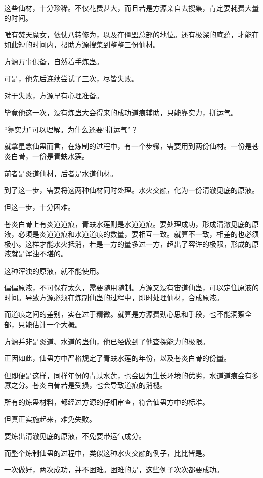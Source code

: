 \begin{this_body}
这些仙材，十分珍稀。不仅花费甚大，而且若是方源亲自去搜集，肯定要耗费大量的时间。

唯有焚天魔女，依仗八转修为，以及在僵盟总部的地位。还有极深的底蕴，才能在如此短的时间内，帮助方源搜集到整整三份仙材。

方源万事俱备，自然着手炼蛊。

可是，他先后连续尝试了三次，尽皆失败。

对于失败，方源早有心理准备。

毕竟他这一次，没有炼蛊大会得来的成功道痕辅助，只能靠实力，拼运气。

“靠实力”可以理解。为什么还要“拼运气”？

就拿星念仙蛊而言，在炼制的过程中，有一个步骤，需要用到两份仙材。一份是苍炎白骨，一份是青蚨水莲。

前者是炎道仙材，后者是水道仙材。

到了这一步，需要将这两种仙材同时处理。水火交融，化为一份清澈见底的原液。

但这一步，十分困难。

苍炎白骨上有炎道道痕，青蚨水莲则是水道道痕。要处理成功，形成清澈见底的原液，必须是炎道道痕和水道道痕的数量，要相互一致。就算不一致，相差的也必须极小。这样才能水火抵消，若是一方的量多过一方，超出了容许的极限，形成的原液就是浑浊不堪的。

这种浑浊的原液，就不能使用。

偏偏原液，不可保存太久，需要随用随制。方源又没有宙道仙蛊，可以定住原液的时间。导致方源必须在炼制仙蛊的过程中，即时处理仙材，合成原液。

而道痕之间的差别，实在过于精微。就算是方源费劲心思和手段，也不能洞察全部，只能估计一个大概。

方源并非是炎道、水道的蛊仙，他已经做到了他查探能力的极限。

正因如此，仙蛊方中严格规定了青蚨水莲的年份，以及苍炎白骨的份量。

但即便是这样，同样年份的青蚨水莲，也会因为生长环境的优劣，水道道痕会有多寡之分。苍炎白骨若是受损，也会导致道痕的消褪。

所有的炼蛊材料，都经过方源的仔细审查，符合仙蛊方中的标准。

但真正实施起来，难免失败。

要炼出清澈见底的原液，不免要带运气成分。

而整个炼制仙蛊的过程中，类似这种水火交融的例子，比比皆是。

一次做好，两次成功，并不困难。困难的是，这些例子次次都要成功。


\end{this_body}
